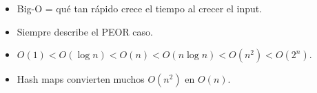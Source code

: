 \begin{dsaresumen}

\begin{itemize}
    \item Big-O = qué tan rápido crece el tiempo al crecer el input.
    \item Siempre describe el PEOR caso.
    \item $O(1) < O(\log n) < O(n) < O(n \log n) < O(n^2) < O(2^n)$.
    \item Hash maps convierten muchos $O(n^2)$ en $O(n)$.
\end{itemize}

\end{dsaresumen}


